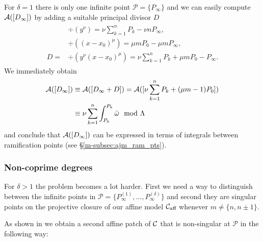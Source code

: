 \documentclass[main.tex]{subfiles}
\begin{document}
  For $\delta = 1$ there is only one infinite point $\mathcal{P} = \{ P_{\infty} \}$ and
  we can easily compute  $\mathcal{A}( [D_{\infty}] )$ by adding a suitable
  principal divisor $D$
    \begin{align}
     \begin{split}
      &\div(y^{\nu})=  \nu \sum_{k = 1}^n P_k - \nu n P_{\infty},\\
      &\div((x-x_0)^{\mu})  =  \mu m P_0 - \mu m P_{\infty} ,\\
      D  =  & \div(y^{\nu}(x-x_0)^{\mu})  = \nu \sum_{k = 1}^n P_k + \mu m P_0 - P_{\infty}.
     \end{split}
    \end{align}
    We immediately obtain
    \begin{align}
     \mathcal{A}( [D_{\infty}] )  & \equiv  \mathcal{A}([D_{\infty} + D])  =  \mathcal{A}( [ \nu \sum_{k = 1}^n P_k + (\mu m - 1) P_0 ]  ) \\ & 
      \equiv   \nu \sum_{k=1}^n \int_{P_0}^{P_k} \bar{\omega} \mod \Lambda
    \end{align}
    and conclude that $\mathcal{A}( [D_{\infty}] )$ can be expressed in terms of integrals between
    ramification points (see \S \ref{m-subsec:ajm_ram_pts}).
   
 \subsubsection{Non-coprime degrees}\label{subsec:ajm_inf_ncop}

  For $\delta > 1$ the problem becomes a lot harder. First we need a way to distinguish between the infinite points in $\mathcal{P}
  = \{ P_{\infty}^{(1)},\dots, P_{\infty}^{(\delta)} \}$ and second they are singular points
  on the projective closure of our affine model $\mathcal{C}_{\text{aff}}$
  whenever $m \ne \{n,n\pm1\}$.
  
  As shown in \cite[\S 1]{CT1996} we obtain a second affine patch of $\mathcal{C}$ that is non-singular at $\mathcal{P}$
  in the following way:
  
\end{document}
